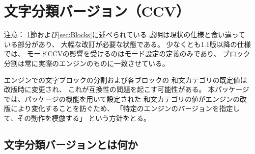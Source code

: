\documentclass[uplatex,dvipdfmx,a4paper]{jsarticle}
\newcommand{\Means}{：\quad}
\newcommand{\strong}{\textsf}
\begin{document}
\section{文字分類バージョン（CCV）}
\label{sec:CCV}

\noindent \strong{注意}\Means
\ref{sec:CCV}節および\ref{sec:Blocks}に述べられている
説明は現状の仕様と食い違っている部分があり、
大幅な改訂が必要な状態である。
少なくとも1.1版以降の仕様では、
モードCCVの影響を受けるのはモード設定の定義のみであり、
ブロック分割は常に実際のエンジンのものに一致させている。

\bigskip

{\upTeX}エンジンでの文字ブロックの分割および各ブロックの
和文カテゴリの既定値は改版時に変更され、
これが互換性の問題を起こす可能性がある。
本パッケージでは、パッケージの機能を用いて設定された
和文カテゴリの値がエンジンの改版により変化することを防ぐため、
「特定のエンジンのバージョンを指定して、その動作を模倣する」
という方針をとる。

\subsection{文字分類バージョンとは何か}
\end{document}
